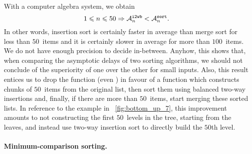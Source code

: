 With a computer algebra system, we obtain
\[
1 \leqslant n \leqslant 50 \Rightarrow \ave{i2wb}{n} < \ave{sort}{n}.
\]
In other words, insertion sort is certainly faster in average than
merge sort for less than \(50\)~items and it is certainly slower in
average for more than \(100\)~items. We do not have enough precision
to decide in\hyp{}between. Anyhow, this shows that, when comparing the
asymptotic delays of two sorting algorithms, we should not conclude of
the superiority of one over the other for small inputs. Also, this
result entices us to drop the function  (even
) in favour of a function which constructs chunks of
\(50\)~items from the original list, then sort them using balanced
two\hyp{}way insertions and, finally, if there are more than
\(50\)~items, start merging these sorted lists. In reference to the
example in \fig~\vref{fig:bottom_up_7}, this improvement amounts to
not constructing the first \(50\)~levels in the tree, starting from
the leaves, and instead use two\hyp{}way insertion sort to directly
build the \(50\)th level.

\medskip

\paragraph{Minimum\hyp{}comparison sorting.}

